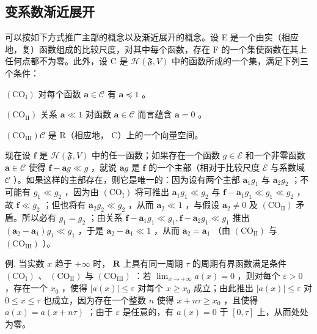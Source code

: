 \subsection{变系数渐近展开}

可以按如下方式推广主部的概念以及渐近展开的概念。设 E 是一个由实（相应地，复）函数组成的比较尺度，对其中每个函数，存在 F 的一个集使函数在其上任何点都不为零。此外，设 C 是 \(\mathcal{H}(\mathfrak{F}, V)\) 中的函数所成的一个集，满足下列三个条件：

\((\mathrm{CO}_{\mathrm{I}})\) 对每个函数 \(\mathbf{a} \in \mathcal{C}\) 有 \(\mathbf{a} \preccurlyeq 1\) 。

\((\mathrm{CO}_{\mathrm{II}})\) 关系 \(\mathbf{a} \ll 1\) 对函数 \(\mathbf{a} \in \mathcal{C}\) 而言蕴含 \(\mathbf{a} = 0\) 。

\((\mathrm{CO}_{\mathrm{III}})\mathcal{C}\) 是 R（相应地， C）上的一个向量空间。

现在设 \(\mathbf{f}\) 是 \(\mathcal{H}(\mathfrak{F}, V)\) 中的任一函数；如果存在一个函数 \(g \in \mathcal{E}\) 和一个非零函数 \(\mathbf{a} \in \mathcal{C}\) 使得 \(\mathbf{f} - \mathbf{a}g \ll g\) ，就说 \(\mathbf{a}g\) 是 \(\mathbf{f}\) 的一个主部（相对于比较尺度 \(\mathcal{E}\) 与系数域 \(\mathcal{C}\) ）。如果这样的主部存在，则它是唯一的：因为设有两个主部 \(\mathbf{a}_1g_1\) 与 \(\mathbf{a}_2g_2\) ；不可能有 \(g_1 \ll g_2\) ，因为由 \((\mathrm{CO_I})\) 将可推出 \(\mathbf{a}_1g_1 \ll g_2\) 与 \(\mathbf{f} - \mathbf{a}_1g_1 \ll g_1 \ll g_2\) ，故 \(\mathbf{f} \ll g_2\) ；但也将有 \(\mathbf{a}_2g_2 \ll g_2\) ，从而 \(\mathbf{a}_2 \ll 1\) ，与假设 \(\mathbf{a}_2 \neq 0\) 及 \((\mathrm{CO_{II}})\) 矛盾。所以必有 \(g_1 = g_2\) ；由关系 \(\mathbf{f} - \mathbf{a}_1g_1 \ll g_1, \mathbf{f} - \mathbf{a}_2g_1 \ll g_1\) 推出 \((\mathbf{a}_2 - \mathbf{a}_1)g_1 \ll g_1\) ，于是 \(\mathbf{a}_2 - \mathbf{a}_1 \ll 1\) ，从而 \(\mathbf{a}_2 = \mathbf{a}_1\) （由 \((\mathrm{CO_{II}})\) 与 \((\mathrm{CO_{III}})\) ）。

例. 当实数 \(x\) 趋于 \(+\infty\) 时， \(\mathbf{R}\) 上具有同一周期 \(\tau\) 的周期有界函数满足条件 \((\mathrm{CO}_{\mathrm{I}})\) 、 \((\mathrm{CO}_{\mathrm{II}})\) 与 \((\mathrm{CO}_{\mathrm{III}})\) ：若 \(\lim_{x\to +\infty}a(x) = 0\) ，则对每个 \(\varepsilon >0\) ，存在一个 \(x_0\) ，使得 \(|a(x)|\leqslant \varepsilon\) 对每个 \(x\geqslant x_0\) 成立；由此推出 \(|a(x)|\leqslant \varepsilon\) 对 \(0\leqslant x\leqslant \tau\) 也成立，因为存在一个整数 \(n\) 使得 \(x + n\tau \geqslant x_0\) ，且使得 \(a(x) = a(x + n\tau)\) ；由于 \(\varepsilon\) 是任意的，有 \(a(x) = 0\) 于 \([0,\tau]\) 上，从而处处为零。

